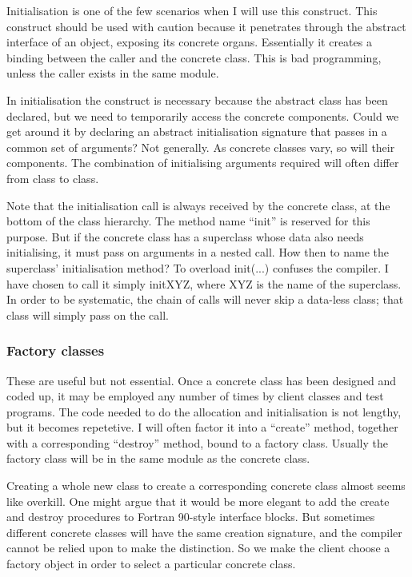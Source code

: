 \documentclass[dvips, 11pt, a4paper]{article}
\begin{document}
Initialisation is one of the few scenarios when I will use this construct.  This construct should be used with caution
because it penetrates through the abstract interface of an object,
exposing its concrete organs.  Essentially it creates a binding
between the caller and the concrete class.  This is bad programming,
 unless the caller exists in the same module.

In initialisation the construct is necessary because the abstract class has
been declared, but we need to temporarily access the concrete components.
Could we get around it by declaring an abstract initialisation signature 
that passes in a common set of arguments?  Not generally.  As concrete
 classes vary, so will their components.  The combination of
 initialising arguments required will often differ from class to class.

Note that the initialisation call is always received by the concrete class,
at the bottom of the class hierarchy.  The method name ``init'' is
 reserved for this purpose.  But if the concrete class has a superclass
 whose data also needs initialising, it must pass on arguments in a
 nested call.  How then to name the superclass' initialisation method?  
To overload init(...) confuses the compiler.  I have chosen to call it
 simply initXYZ, where XYZ is the name of the superclass.  In order to be 
systematic, the chain of calls will never skip a data-less class; that 
class will simply pass on the call.

\subsubsection{Factory classes}

These are useful but not essential.  Once a concrete class has been designed
and coded up, it may be employed any number of times by client classes and
test programs.  The code needed to do the allocation and initialisation 
is not lengthy, but it becomes repetetive.  I will often factor it into a 
``create'' method, together with a corresponding ``destroy'' method, 
bound to a factory class.  Usually the factory class will be in the same module as the concrete class.

Creating a whole new class to create a corresponding concrete class almost seems like overkill.  One might argue that it would be more elegant to add
the create and destroy procedures to Fortran 90-style interface blocks.
But sometimes different concrete classes will have the same creation 
signature, and the compiler cannot be relied upon to make the distinction.
So we make the client choose a factory object in order to
select a particular concrete class.
\end{document}
